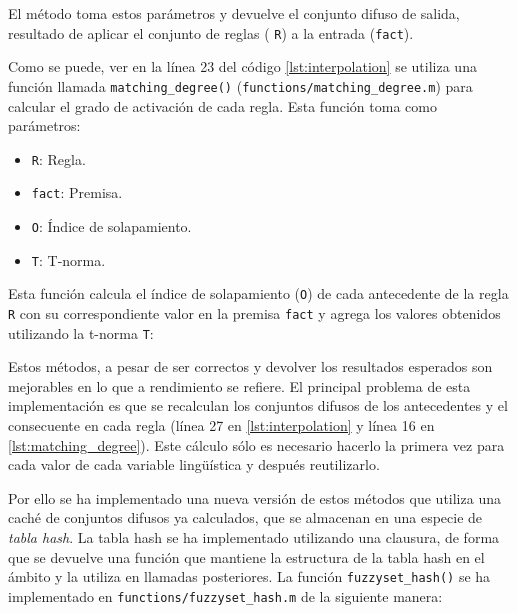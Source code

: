El método toma estos parámetros y devuelve el conjunto difuso de salida, resultado de aplicar el conjunto de reglas ( \lstinline|R|) a la entrada (\lstinline|fact|).



Como se puede, ver en la línea 23 del código \ref{lst:interpolation} se utiliza una función llamada \lstinline|matching_degree()| (\lstinline|functions/matching_degree.m|) para calcular el grado de activación de cada regla. Esta función toma como parámetros:

\begin{itemize}
\item \lstinline|R|: Regla.
\item \lstinline|fact|: Premisa.
\item \lstinline|O|: Índice de solapamiento.
\item \lstinline|T|: T-norma.
\end{itemize}

Esta función calcula el índice de solapamiento (\lstinline|O|) de cada antecedente de la regla \lstinline|R| con su correspondiente valor en la premisa \lstinline|fact|  y agrega los valores obtenidos utilizando la t-norma \lstinline|T|:



Estos métodos, a pesar de ser correctos y devolver los resultados esperados son mejorables en lo que a rendimiento se refiere. El principal problema de esta implementación es que se recalculan los conjuntos difusos de los antecedentes y el consecuente en cada regla (línea 27 en \ref{lst:interpolation} y línea 16 en \ref{lst:matching_degree}). Este cálculo sólo es necesario hacerlo la primera vez para cada valor de cada variable lingüística y después reutilizarlo.

Por ello se ha implementado una nueva versión de estos métodos que utiliza una caché de conjuntos difusos ya calculados, que se almacenan en una especie de \emph{tabla hash}. La tabla hash se ha implementado utilizando una clausura, de forma que se devuelve una función que mantiene la estructura de la tabla hash en el ámbito y la utiliza en llamadas posteriores. La función \lstinline|fuzzyset_hash()| se ha implementado en \lstinline|functions/fuzzyset_hash.m| de la siguiente manera:

